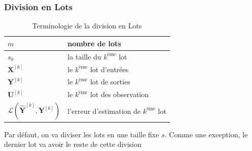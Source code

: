\subsubsection{Division en Lots}
\begin{table}[ht]
	\centering
	\begin{tabularx}{\textwidth}{| X | X |}
		\hline
		$m$ & nombre de lots \\ 
		\hline
		$s_k$ & la taille du $k^\text{ème}$ lot \\
		\hline
		$\boldsymbol{X}^{[k]}$ & le $k^\text{ème}$ lot d'entrées \\
		\hline
		$\boldsymbol{Y}^{[k]}$ & le $k^\text{ème}$ lot de sorties \\
		\hline
		$\boldsymbol{U}^{[k]}$ & le $k^\text{ème}$ lot des observation \\ 
		\hline
		
		$\mathcal{L}(\hat{\boldsymbol{Y}}^{[k]},\boldsymbol{Y}^{[k]})$                    & l'erreur d'estimation de $k^\text{ème}$ lot       \\ 
		\hline 
		
	\end{tabularx}
	\caption{Terminologie de la division en Lots}
	\label{table:Batch}
\end{table}
\begin{remark}
	Par défaut, on va diviser les lots en une taille fixe $s$. \newline
	Comme une exception, le dernier lot va avoir le reste de cette division
\end{remark}
\FloatBarrier
\newpage

